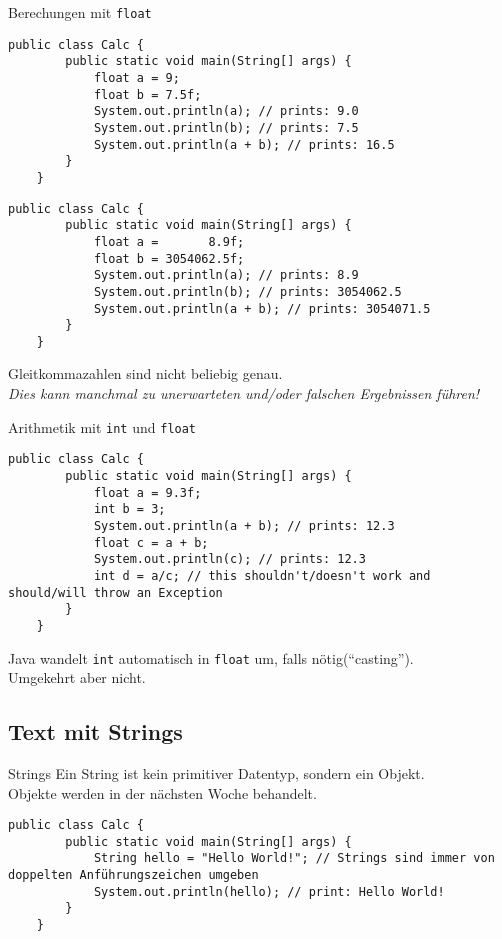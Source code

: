 \begin{frame}{Berechungen mit \texttt{float}}
    \begin{lstlisting}[gobble=4]
    public class Calc {
        public static void main(String[] args) {
            float a = 9;
            float b = 7.5f;
            System.out.println(a); // prints: 9.0
            System.out.println(b); // prints: 7.5
            System.out.println(a + b); // prints: 16.5
        }
    }\end{lstlisting}
\framebreak
	\begin{lstlisting}[gobble=4]
	public class Calc {
	    public static void main(String[] args) {
	        float a =       8.9f;
	        float b = 3054062.5f;
	        System.out.println(a); // prints: 8.9
	        System.out.println(b); // prints: 3054062.5
	        System.out.println(a + b); // prints: 3054071.5
	    }
	}\end{lstlisting}
	Gleitkommazahlen sind nicht beliebig genau. \\
	\emph{Dies kann manchmal zu unerwarteten und/oder falschen Ergebnissen führen!}
\end{frame}

\begin{frame}[fragile]{Arithmetik mit \texttt{int} und \texttt{float}}
	\begin{lstlisting}[gobble=4]
	public class Calc {
	    public static void main(String[] args) {
	        float a = 9.3f;
	        int b = 3;
	        System.out.println(a + b); // prints: 12.3
	        float c = a + b;
	        System.out.println(c); // prints: 12.3
            int d = a/c; // this shouldn't/doesn't work and should/will throw an Exception
	    }
	}\end{lstlisting}
    Java wandelt \texttt{int} automatisch in \texttt{float} um, falls nötig(\enquote{casting}). \\
	Umgekehrt aber nicht.
\end{frame}

\subsection{Text mit Strings}

\begin{frame}[fragile]{Strings}
    Ein String ist kein primitiver Datentyp, sondern ein Objekt\footnotemark[1]. \\
	Objekte werden in der nächsten Woche behandelt.
	\begin{lstlisting}[gobble=4]
	public class Calc {
	    public static void main(String[] args) {
	        String hello = "Hello World!"; // Strings sind immer von doppelten Anführungszeichen umgeben
	        System.out.println(hello); // print: Hello World!
	    }
	}\end{lstlisting}
\end{frame}

